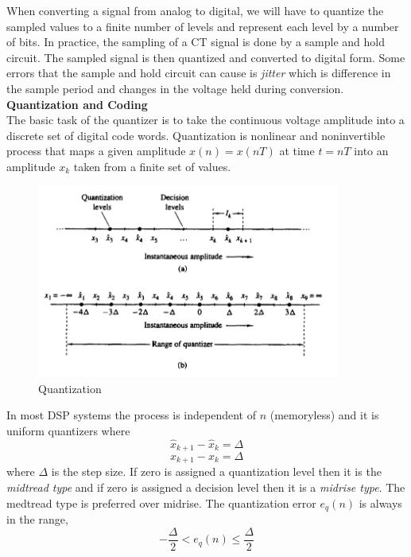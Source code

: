 \documentclass{article} %
\begin{document}
	When converting a signal from analog to digital, we will have to quantize the sampled values to a finite number of levels and represent each level by a number of bits. In practice, the sampling of a CT signal is done by a sample and hold circuit. The sampled signal is then quantized and converted to digital form. Some errors that the sample and hold circuit can cause is \textit{jitter} which is difference in the sample period and changes in the voltage held during conversion. \\
	\textbf{Quantization and Coding}\\
	
	The basic task of the quantizer is to take the continuous voltage amplitude into a discrete set of digital code words. Quantization is nonlinear and noninvertible process that maps a given amplitude $x(n) = x(nT)$ at time $t = nT$ into an amplitude $x_k$ taken from a finite set of values. 
	
	\begin{figure}[h]
	\centering
	\includegraphics[width=10cm]{quant}
	\caption{Quantization}
	\end{figure}
	In most DSP systems the process is independent of $n$ (memoryless) and it is uniform quantizers where
	\begin{equation}
	\hat{x}_{k+1} - \hat{x}_k = \Delta
	\end{equation}
	\begin{equation}
	x_{k+1} - x_k = \Delta
	\end{equation}
	where $\Delta$ is the step size. If zero is assigned a quantization level then it is the \textit{midtread type} and if zero is assigned a decision level then it is a \textit{midrise type}. The medtread type is preferred over midrise. The quantization error $e_q(n)$ is always in the range,
	\begin{equation}
	-\frac{\Delta}{2} < e_q(n) \le \frac{\Delta}{2}
	\end{equation}
	
\end{document}
